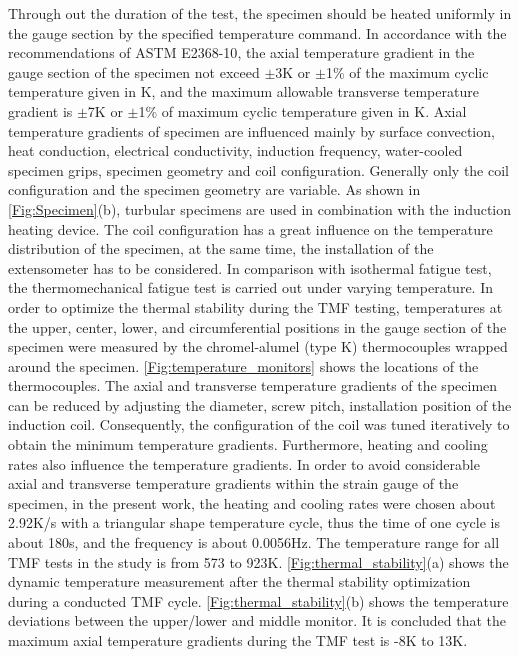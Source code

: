 Through out the duration of the test, the specimen should be heated uniformly in the gauge section by the specified temperature command. In accordance with the recommendations of ASTM E2368-10\cite{ASTME2005}, the axial temperature gradient in the gauge section of the specimen not exceed $\pm$3K or $\pm$1\% of the
maximum cyclic temperature given in K, and the maximum allowable transverse temperature gradient is $\pm$7K or $\pm$1\% of maximum cyclic temperature given in K.
Axial temperature gradients of specimen are influenced mainly by surface convection, heat conduction, electrical conductivity, induction frequency, water-cooled specimen grips, specimen geometry and coil configuration. Generally only the coil configuration and the specimen geometry are variable. As shown in \ref{Fig:Specimen}(b), turbular specimens are used in combination with the induction heating device. The coil configuration has a great influence on the temperature distribution of the specimen, at the same time, the installation of the extensometer has to be considered\cite{Hahner2006}.
In comparison with isothermal fatigue test, the thermomechanical fatigue test is carried out under varying temperature.
In order to optimize the thermal stability during the TMF testing, temperatures at the upper, center, lower, and circumferential positions in the gauge section of the specimen were measured by the chromel-alumel (type K) thermocouples wrapped around the specimen. \ref{Fig:temperature_monitors} shows the locations of the thermocouples.
The axial and transverse temperature gradients of the specimen can be reduced by adjusting the diameter, screw pitch, installation position of the induction coil.
Consequently, the configuration of the coil was tuned iteratively to obtain the minimum temperature gradients.
Furthermore, heating and cooling rates also influence the temperature gradients.
In order to avoid considerable axial and transverse temperature gradients within the strain gauge of the specimen, in the present work, the heating and cooling rates were chosen about 2.92K/s with a triangular shape temperature cycle, thus the time of one cycle is about 180s, and the frequency is about 0.0056Hz.
The temperature range for all TMF tests in the study is from 573 to 923K. \ref{Fig:thermal_stability}(a) shows the dynamic temperature measurement after the thermal stability optimization during a conducted TMF cycle. \ref{Fig:thermal_stability}(b) shows the temperature
deviations between the upper/lower and middle monitor. It is concluded that the maximum axial temperature gradients during the TMF test is -8K to 13K.

